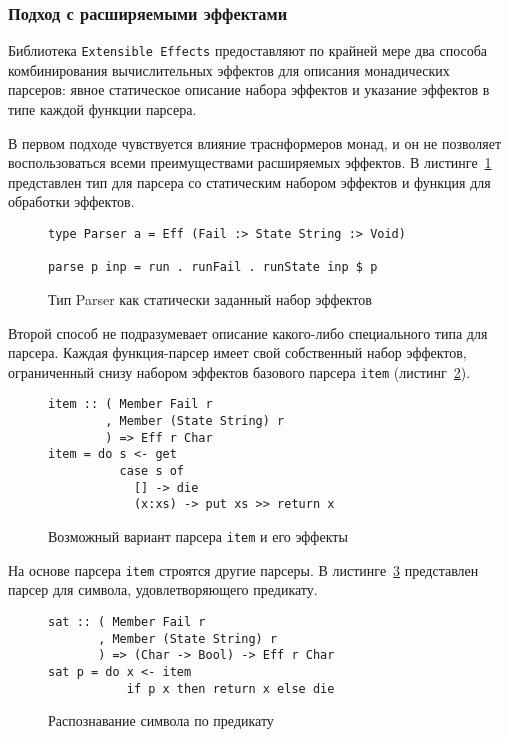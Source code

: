 \newpage

\subsubsection{Подход с расширяемыми эффектами}

Библиотека \lstinline{Extensible Effects} предоставляют по крайней мере два способа комбинирования вычислительных эффектов для описания монадических парсеров: явное статическое описание набора эффектов и указание эффектов в типе каждой функции парсера. 

В первом подходе чувствуется влияние траснформеров монад, и он не позволяет воспользоваться всеми преимуществами расширяемых эффектов. В листинге~\ref{listing:ExtEffectsParser} представлен тип для парсера со статическим набором эффектов и функция для обработки эффектов.

\begin{figure}[h]
\begin{lstlisting}
type Parser a = Eff (Fail :> State String :> Void)

parse p inp = run . runFail . runState inp $ p 
\end{lstlisting}
\caption{Тип Parser как статически заданный набор эффектов}
\label{listing:ExtEffectsParser}
\end{figure}

Второй способ не подразумевает описание какого-либо специального типа для парсера. Каждая функция-парсер имеет свой собственный набор эффектов, ограниченный снизу набором эффектов базового парсера \lstinline{item} (листинг~\ref{listing:ExtEffectsItem}).

\begin{figure}[h]
\begin{lstlisting}
item :: ( Member Fail r
        , Member (State String) r
        ) => Eff r Char
item = do s <- get
          case s of 
            [] -> die
            (x:xs) -> put xs >> return x 
\end{lstlisting}
\caption{Возможный вариант парсера \lstinline{item} и его эффекты}
\label{listing:ExtEffectsItem}
\end{figure}

На основе парсера \lstinline{item} строятся другие парсеры. В листинге~\ref{listing:ExtEffectsSat} представлен парсер для символа, удовлетворяющего предикату. 

\begin{figure}[h]
\begin{lstlisting}
sat :: ( Member Fail r
       , Member (State String) r
       ) => (Char -> Bool) -> Eff r Char
sat p = do x <- item
           if p x then return x else die
\end{lstlisting}
\caption{Распознавание символа по предикату}
\label{listing:ExtEffectsSat}
\end{figure} 

